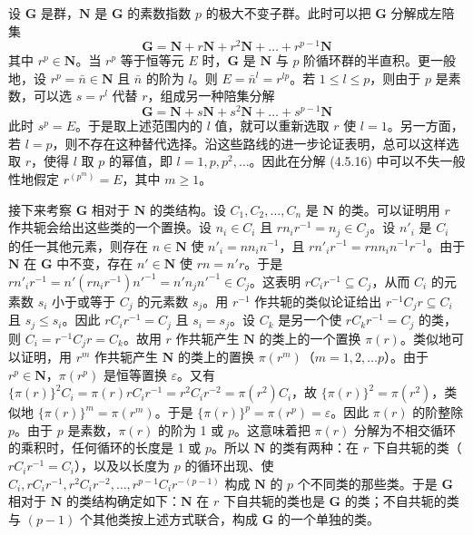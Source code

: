 设 $\mathbf{G}$ 是群，$\mathbf{N}$ 是 $\mathbf{G}$ 的素数指数 $p$ 的极大不变子群。此时可以把 $\mathbf{G}$ 分解成左陪集
\begin{equation*}
\mathbf{G} = \mathbf{N} + r\mathbf{N} + r^{2}\mathbf{N} + \dots + r^{p-1}\mathbf{N}
\tag{4.5.16}
\end{equation*}
其中 $r^{p} \in \mathbf{N}$。当 $r^{p}$ 等于恒等元 $E$ 时，$\mathbf{G}$ 是 $\mathbf{N}$ 与 $p$ 阶循环群的半直积。更一般地，设 $r^{p} = \bar{n} \in \mathbf{N}$ 且 $\bar{n}$ 的阶为 $l$。则 $E = \bar{n}^{l} = r^{lp}$。若 $1 \leqslant l \leqslant p$，则由于 $p$ 是素数，可以选 $s = r^{l}$ 代替 $r$，组成另一种陪集分解
\begin{equation*}
\mathbf{G} = \mathbf{N} + s\mathbf{N} + s^{2}\mathbf{N} + \dots + s^{p-1}\mathbf{N}
\tag{4.5.17}
\end{equation*}
此时 $s^{p} = E$。于是取上述范围内的 $l$ 值，就可以重新选取 $r$ 使 $l = 1$。另一方面，若 $l = p$，则不存在这种替代选择。沿这些路线的进一步论证表明，总可以这样选取 $r$，使得 $l$ 取 $p$ 的幂值，即 $l = 1, p, p^{2}, \dots$。因此在分解 (4.5.16) 中可以不失一般性地假定 $r^{(p^{m})} = E$，其中 $m \geqslant 1$。

接下来考察 $\mathbf{G}$ 相对于 $\mathbf{N}$ 的类结构。设 $C_{1}, C_{2}, \dots, C_{n}$ 是 $\mathbf{N}$ 的类。可以证明用 $r$ 作共轭会给出这些类的一个置换。设 $n_{i} \in C_{i}$ 且 $rn_{i}r^{-1} = n_{j} \in C_{j}$。设 $n'_{i}$ 是 $C_{i}$ 的任一其他元素，则存在 $n \in \mathbf{N}$ 使 $n'_{i} = nn_{i}n^{-1}$，且 $rn'_{i}r^{-1} = rnn_{i}n^{-1}r^{-1}$。由于 $\mathbf{N}$ 在 $\mathbf{G}$ 中不变，存在 $n' \in \mathbf{N}$ 使 $rn = n'r$。于是 $rn'_{i}r^{-1} = n'(rn_{i}r^{-1})n'^{-1} = n'n_{j}n'^{-1} \in C_{j}$。这表明 $rC_{i}r^{-1} \subseteq C_{j}$，从而 $C_{i}$ 的元素数 $s_{i}$ 小于或等于 $C_{j}$ 的元素数 $s_{j}$。用 $r^{-1}$ 作共轭的类似论证给出 $r^{-1}C_{j}r \subseteq C_{i}$ 且 $s_{j} \leqslant s_{i}$。因此 $rC_{i}r^{-1} = C_{j}$ 且 $s_{i} = s_{j}$。设 $C_{k}$ 是另一个使 $rC_{k}r^{-1} = C_{j}$ 的类，则 $C_{i} = r^{-1}C_{j}r = C_{k}$。故用 $r$ 作共轭产生 $\mathbf{N}$ 的类上的一个置换 $\pi(r)$。类似地可以证明，用 $r^{m}$ 作共轭产生 $\mathbf{N}$ 的类上的置换 $\pi(r^{m})$（$m = 1, 2, \dots p$）。由于 $r^{p} \in \mathbf{N}$，$\pi(r^{p})$ 是恒等置换 $\varepsilon$。又有 $\{\pi(r)\}^{2}C_{i} = \pi(r)rC_{i}r^{-1} = r^{2}C_{i}r^{-2} = \pi(r^{2})C_{i}$，故 $\{\pi(r)\}^{2} = \pi(r^{2})$，类似地 $\{\pi(r)\}^{m} = \pi(r^{m})$。于是 $\{\pi(r)\}^{p} = \pi(r^{p}) = \varepsilon$。因此 $\pi(r)$ 的阶整除 $p$。由于 $p$ 是素数，$\pi(r)$ 的阶为 1 或 $p$。这意味着把 $\pi(r)$ 分解为不相交循环的乘积时，任何循环的长度是 1 或 $p$。所以 $\mathbf{N}$ 的类有两种：在 $r$ 下自共轭的类（$rC_{i}r^{-1} = C_{i}$），以及以长度为 $p$ 的循环出现、使 $C_{i}, rC_{i}r^{-1}, r^{2}C_{i}r^{-2}, \dots, r^{p-1}C_{i}r^{-(p-1)}$ 构成 $\mathbf{N}$ 的 $p$ 个不同类的那些类。于是 $\mathbf{G}$ 相对于 $\mathbf{N}$ 的类结构确定如下：$\mathbf{N}$ 在 $r$ 下自共轭的类也是 $\mathbf{G}$ 的类；不自共轭的类与 $(p-1)$ 个其他类按上述方式联合，构成 $\mathbf{G}$ 的一个单独的类。


